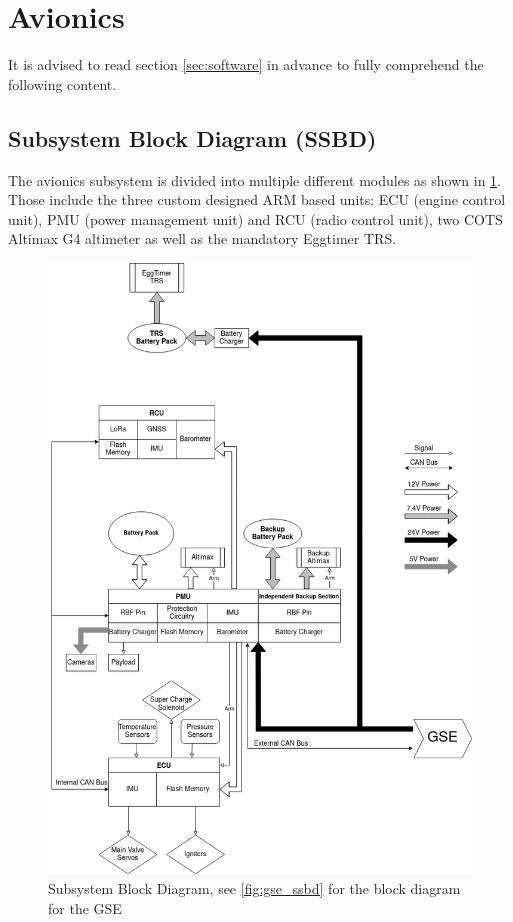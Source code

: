 \section{Avionics}\label{sec:avi} %

It is advised to read section \ref{sec:software} in 
advance to fully comprehend the following content.

\subsection{Subsystem Block Diagram (SSBD)}
The avionics subsystem is divided into multiple different modules as shown in \cref{fig:avi_ssbd}. 
Those include the three custom designed ARM based units: ECU (engine control unit), PMU (power management unit) and RCU (radio control unit), two COTS Altimax G4 altimeter as well as the mandatory Eggtimer TRS. 

\begin{figure}[H]
    \centering
    \includegraphics[scale=0.4]{Avionics/Avionics_Blockdiagram.png}
    \caption{Subsystem Block Diagram, see \cref{fig:gse_ssbd} for the block diagram for the GSE}
    \label{fig:avi_ssbd}
\end{figure}

